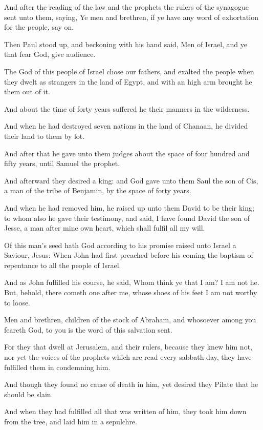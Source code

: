 \verse And after the reading of the law and the prophets the rulers of the synagogue sent unto them, saying, Ye men and brethren, if ye have any word of exhortation for the people, say on.

\verse Then Paul stood up, and beckoning with his hand said, Men of Israel, and ye that fear God, give audience.

\verse The God of this people of Israel chose our fathers, and exalted the people when they dwelt as strangers in the land of Egypt, and with an high arm brought he them out of it.

\verse And about the time of forty years suffered he their manners in the wilderness.

\verse And when he had destroyed seven nations in the land of Chanaan, he divided their land to them by lot.

\verse And after that he gave unto them judges about the space of four hundred and fifty years, until Samuel the prophet.

\verse And afterward they desired a king: and God gave unto them Saul the son of Cis, a man of the tribe of Benjamin, by the space of forty years.

\verse And when he had removed him, he raised up unto them David to be their king; to whom also he gave their testimony, and said, I have found David the son of Jesse, a man after mine own heart, which shall fulfil all my will.

\verse Of this man's seed hath God according to his promise raised unto Israel a Saviour, Jesus: \verse When John had first preached before his coming the baptism of repentance to all the people of Israel.

\verse And as John fulfilled his course, he said, Whom think ye that I am?  I am not he. But, behold, there cometh one after me, whose shoes of his feet I am not worthy to loose.

\verse Men and brethren, children of the stock of Abraham, and whosoever among you feareth God, to you is the word of this salvation sent.

\verse For they that dwell at Jerusalem, and their rulers, because they knew him not, nor yet the voices of the prophets which are read every sabbath day, they have fulfilled them in condemning him.

\verse And though they found no cause of death in him, yet desired they Pilate that he should be slain.

\verse And when they had fulfilled all that was written of him, they took him down from the tree, and laid him in a sepulchre.

